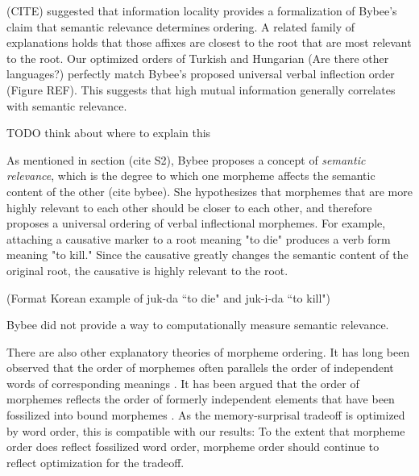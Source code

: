 \documentclass[11pt,letterpaper]{article}
\newcommand\becky[1]{{\color{blue}(#1)}}
\begin{document}
(CITE) suggested that information locality provides a formalization of Bybee's \citep{bybee-morphology-1985} claim that semantic relevance determines ordering.
A related family of explanations holds that those affixes are closest to the root that are most relevant to the root.
Our optimized orders of Turkish and Hungarian \becky{Are there other languages?} perfectly match Bybee's proposed universal verbal inflection order (Figure REF).
This suggests that high mutual information generally correlates with semantic relevance. 

TODO think about where to explain this

As mentioned in section \becky{cite S2}, Bybee proposes a concept of \textit{semantic relevance}, which is the degree to which one morpheme affects the semantic content of the other \becky{cite bybee}. She hypothesizes that morphemes that are more highly relevant to each other should be closer to each other, and therefore proposes a universal ordering of verbal inflectional morphemes. For example, attaching a causative marker to a root meaning "to die" produces a verb form meaning "to kill." Since the causative greatly changes the semantic content of the original root, the causative is highly relevant to the root. 

\becky{Format Korean example of juk-da ``to die" and juk-i-da ``to kill"}

Bybee did not provide a way to computationally measure semantic relevance. 





There are also other explanatory theories of morpheme ordering.
It has long been observed that the order of morphemes often parallels the order of independent words of corresponding meanings \citep{givon1971historical,venneman1973explanation,baker1985the}.
It has been argued that the order of morphemes reflects the order of formerly independent elements that have been fossilized into bound morphemes \citet{givon1971historical,venneman1973explanation}.
As the memory-surprisal tradeoff is optimized by word order, this is compatible with our results:
To the extent that morpheme order does reflect fossilized word order, morpheme order should continue to reflect optimization for the tradeoff.
\end{document}
